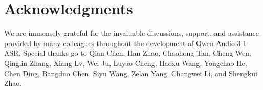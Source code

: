 \documentclass{article}
\begin{document}
\section{Acknowledgments}

We are immensely grateful for the invaluable discussions, support, and assistance provided by many colleagues throughout the development of Qwen-Audio-3.1-ASR. Special thanks go to Qian Chen, Han Zhao, Chaohong Tan, Cheng Wen, Qinglin Zhang, Xiang Lv, Wei Ju, Luyao Cheng, Haoxu Wang, Yongchao He, Chen Ding, Bangduo Chen, Siyu Wang, Zelan Yang, Changwei Li, and Shengkui Zhao.





%

%
%

%

%
%
%
%
%
%
%
%
%
%
%
%
%
%
%
%
%
%
%
%
%
%
%
%
%
%
\end{document}
